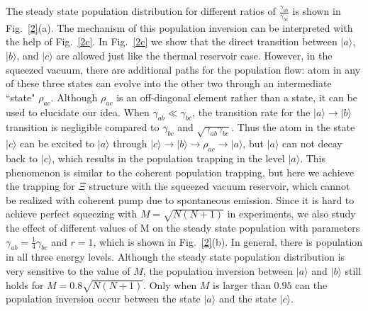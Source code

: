 \documentclass[aps,showpacs,twocolumn,twoside,groupedaddress]{revtex4}
\begin{document}
The steady state population distribution for different ratios of $\frac{\gamma_{ab}}{\gamma_{bc}}$ is shown in Fig.~\ref{2}(a). The mechanism of this population inversion can be interpreted with the help of Fig.~\ref{2c}. In Fig.~\ref{2c} we show that the direct transition between $|a\rangle$, $|b\rangle$, and $|c\rangle$ are allowed just like the thermal reservoir case. However, in the squeezed vacuum, there are additional paths for the population flow: atom in any of these three states can evolve into the other two through an intermediate ``state" $\rho_{ac}$. Although $\rho_{ac}$ is an off-diagonal element rather than a state, it can be used to elucidate our idea. When $\gamma_{ab}\ll\gamma_{bc}$, the transition rate for the $|a\rangle\rightarrow|b\rangle$ transition is negligible compared to $\gamma_{bc}$ and $\sqrt{\gamma_{ab}\gamma_{bc}}$. Thus the atom in the state $|c\rangle$ can be excited to $|a\rangle$ through $|c\rangle\rightarrow|b\rangle\rightarrow\rho_{ac}\rightarrow|a\rangle$, but $|a\rangle$ can not decay back to $|c\rangle$, which results in the population trapping in the level $|a\rangle$. This phenomenon is similar to the coherent population trapping, but here we achieve the trapping for $\Xi$ structure with the squeezed vacuum reservoir, which cannot be realized with coherent pump due to spontaneous emission. Since it is hard to achieve perfect squeezing with $M=\sqrt{N(N+1)}$ in experiments, we also study the effect of different values of M on the steady state population with parameters $\gamma_{ab}=\frac{1}{4}\gamma_{bc}$ and $r=1$, which is shown in Fig.~\ref{2}(b). In general, there is population in all three energy levels. Although the steady state population distribution is very sensitive to the value of $M$, the population inversion between $|a\rangle$ and $|b\rangle$ still holds for $M=0.8\sqrt{N(N+1)}$. Only when $M$ is larger than $0.95$ can the population inversion occur between the state $|a\rangle$ and the state $|c\rangle$.
\end{document}
